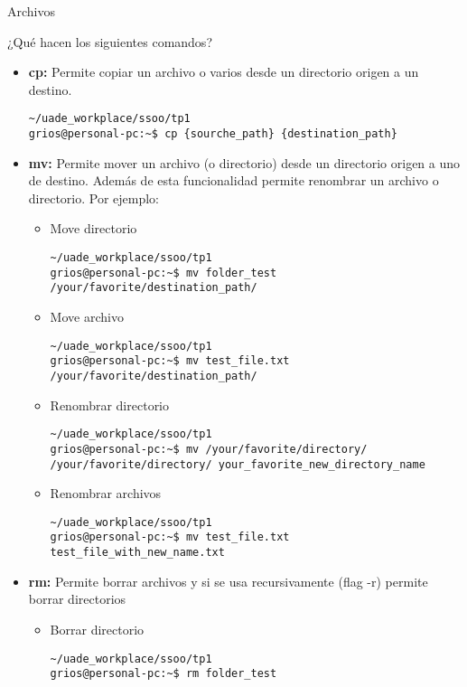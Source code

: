 \begin{section}{Archivos}

\begin{quoting}
¿Qué hacen los siguientes comandos?
\end{quoting}


\begin{itemize}

\item \textbf{cp:}
Permite copiar un archivo o varios desde un directorio origen a un destino.
\begin{lstlisting}[style=Ubuntu]
~/uade_workplace/ssoo/tp1
grios@personal-pc:~$ cp {sourche_path} {destination_path}
\end{lstlisting}

\item \textbf{mv:}
Permite mover un archivo (o directorio) desde un directorio origen a uno de destino. Además de esta funcionalidad permite renombrar un archivo o directorio. Por ejemplo:

\begin{itemize}
\item Move directorio
\begin{lstlisting}[style=Ubuntu]
~/uade_workplace/ssoo/tp1
grios@personal-pc:~$ mv folder_test /your/favorite/destination_path/
\end{lstlisting}

\item Move archivo
\begin{lstlisting}[style=Ubuntu]
~/uade_workplace/ssoo/tp1
grios@personal-pc:~$ mv test_file.txt /your/favorite/destination_path/
\end{lstlisting}

\item Renombrar directorio
\begin{lstlisting}[style=Ubuntu]
~/uade_workplace/ssoo/tp1
grios@personal-pc:~$ mv /your/favorite/directory/ /your/favorite/directory/ your_favorite_new_directory_name
\end{lstlisting}

\item Renombrar archivos
\begin{lstlisting}[style=Ubuntu]
~/uade_workplace/ssoo/tp1
grios@personal-pc:~$ mv test_file.txt test_file_with_new_name.txt
\end{lstlisting}
\end{itemize}

\item \textbf{rm:}
Permite borrar archivos y si se usa recursivamente (flag -r) permite borrar directorios
\begin{itemize}
\item Borrar directorio
\begin{lstlisting}[style=Ubuntu]
~/uade_workplace/ssoo/tp1
grios@personal-pc:~$ rm folder_test
\end{lstlisting}


\end{itemize}
\end{itemize}
\end{section}
